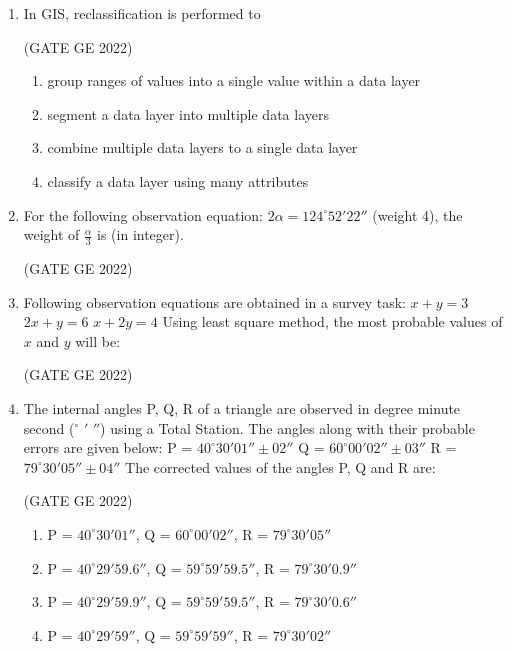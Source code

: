 \documentclass[journal,12pt,onecolumn]{IEEEtran}
\theoremstyle{remark}
\begin{document}
\begin{enumerate}
\item In GIS, reclassification is performed to

\hfill (GATE GE 2022)

\begin{enumerate}
    \item group ranges of values into a single value within a data layer
    \item segment a data layer into multiple data layers
    \item combine multiple data layers to a single data layer
    \item classify a data layer using many attributes
\end{enumerate}

\item For the following observation equation: $2\alpha = 124^\circ 52' 22''$ (weight 4), the weight of $\frac{\alpha}{3}$ is \makebox[1cm]{\hrulefill} (in integer).

\hfill (GATE GE 2022)

\item Following observation equations are obtained in a survey task:  
$x + y = 3$  
$2x + y = 6$  
$x + 2y = 4$  
Using least square method, the most probable values of $x$ and $y$ will be:

\hfill (GATE GE 2022)

\begin{enumerate}
\end{enumerate}

\item The internal angles P, Q, R of a triangle are observed in degree minute second ($^\circ$ $'$ $''$) using a Total Station. The angles along with their probable errors are given below:  
P = $40^\circ 30' 01'' \pm 02''$  
Q = $60^\circ 00' 02'' \pm 03''$  
R = $79^\circ 30' 05'' \pm 04''$  
The corrected values of the angles P, Q and R are:

\hfill (GATE GE 2022)

\begin{enumerate}
    \item P = $40^\circ 30' 01''$, Q = $60^\circ 00' 02''$, R = $79^\circ 30' 05''$
    \item P = $40^\circ 29' 59.6''$, Q = $59^\circ 59' 59.5''$, R = $79^\circ 30' 0.9''$
    \item P = $40^\circ 29' 59.9''$, Q = $59^\circ 59' 59.5''$, R = $79^\circ 30' 0.6''$
    \item P = $40^\circ 29' 59''$, Q = $59^\circ 59' 59''$, R = $79^\circ 30' 02''$
\end{enumerate}


\end{enumerate}
\end{document}
